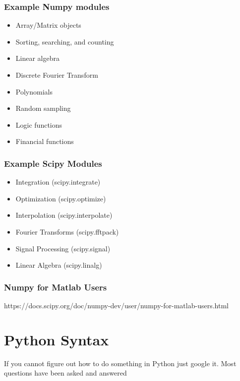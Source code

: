 \documentclass[11pt]{article}
\providecommand{\tightlist}{%
      \setlength{\itemsep}{0pt}\setlength{\parskip}{0pt}}
\begin{document}
    \subsubsection{Example Numpy modules}\label{example-numpy-modules}

\begin{itemize}
\tightlist
\item
  Array/Matrix objects
\item
  Sorting, searching, and counting
\item
  Linear algebra
\item
  Discrete Fourier Transform
\item
  Polynomials
\item
  Random sampling
\item
  Logic functions
\item
  Financial functions
\end{itemize}

    \subsubsection{Example Scipy Modules}\label{example-scipy-modules}

\begin{itemize}
\tightlist
\item
  Integration (scipy.integrate)
\item
  Optimization (scipy.optimize)
\item
  Interpolation (scipy.interpolate)
\item
  Fourier Transforms (scipy.fftpack)
\item
  Signal Processing (scipy.signal)
\item
  Linear Algebra (scipy.linalg)
\end{itemize}

    \subsubsection{Numpy for Matlab Users}\label{numpy-for-matlab-users}

https://docs.scipy.org/doc/numpy-dev/user/numpy-for-matlab-users.html

    \section{Python Syntax}\label{python-syntax}

If you cannot figure out how to do something in Python just google it.
Most questions have been asked and answered
\end{document}
